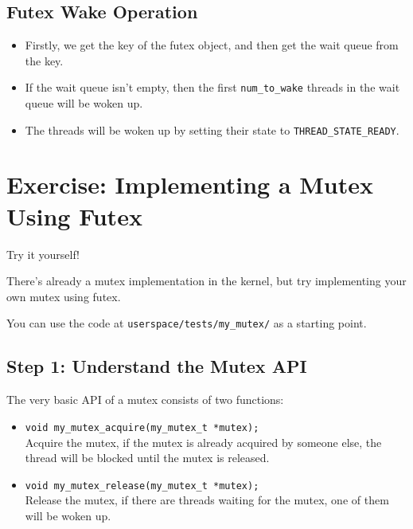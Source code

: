 \subsection{Futex Wake Operation}

\begin{itemize}
    \item Firstly, we get the key of the futex object, and then get the wait queue
          from the key.
    \item If the wait queue isn't empty, then the first \texttt{num\_to\_wake} threads
          in the wait queue will be woken up.
    \item The threads will be woken up by setting their state to \texttt{THREAD\_STATE\_READY}.
\end{itemize}

\section*{Exercise: Implementing a Mutex Using Futex}

\begin{exercise*}{Try it yourself!}
    \item There's already a mutex implementation in the kernel, but try implementing
    your own mutex using futex.
    \item You can use the code at \texttt{userspace/tests/my\_mutex/} as a starting point.
\end{exercise*}

\subsection{Step 1: Understand the Mutex API}

The very basic API of a mutex consists of two functions:

\begin{itemize}
    \item \texttt{void my\_mutex\_acquire(my\_mutex\_t *mutex);} \\
          Acquire the mutex, if the mutex is already acquired by someone else, the
          thread will be blocked until the mutex is released.
    \item \texttt{void my\_mutex\_release(my\_mutex\_t *mutex);} \\
          Release the mutex, if there are threads waiting for the mutex, one of them
          will be woken up.
\end{itemize}

